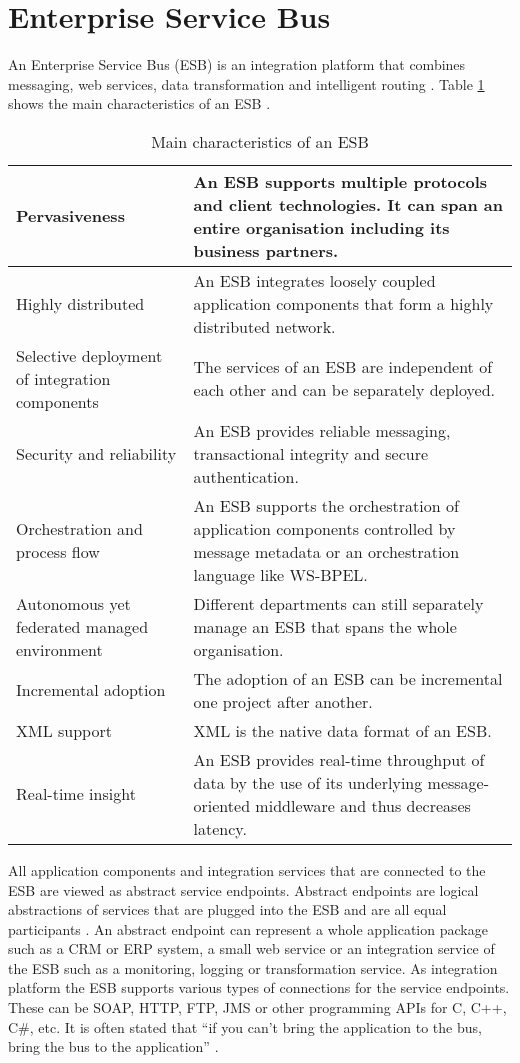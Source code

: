 \section{Enterprise Service Bus}
An Enterprise Service Bus (ESB) is an integration platform that combines messaging, web services, data transformation and intelligent routing \citep{Schulte:2002mz}.
Table \ref{tab:char_esb} shows the main characteristics of an ESB \citep{Chappell:2004jo}.
\begin{table}[htbp]
	\centering
	\begin{tabular}{|p{}|p{}|}
		\hline
		Pervasiveness & An ESB supports multiple protocols and client technologies. It can span an entire organisation including its business partners. \\ \hline
		Highly distributed & An ESB integrates loosely coupled application components that form a highly distributed network. \\ \hline
		Selective deployment of integration components & The services of an ESB are independent of each other and can be separately deployed. \\ \hline
		Security and reliability & An ESB provides reliable messaging, transactional integrity and secure authentication. \\ \hline
		Orchestration and process flow & An ESB supports the orchestration of application components controlled by message metadata or an orchestration language like WS-BPEL. \\ \hline
		Autonomous yet federated managed environment & Different departments can still separately manage an ESB that spans the whole organisation. \\ \hline
		Incremental adoption & The adoption of an ESB can be incremental one project after another. \\ \hline
		XML support & XML is the native data format of an ESB. \\ \hline
		Real-time insight & An ESB provides real-time throughput of data by the use of its underlying message-oriented middleware and thus decreases latency. \\
		\hline
	\end{tabular}
	\caption{Main characteristics of an ESB \citep{Chappell:2004jo}}
	\label{tab:char_esb}
\end{table}
All application components and integration services that are connected to the ESB are viewed as abstract service endpoints. Abstract endpoints are logical abstractions of services that are plugged into the ESB and are all equal participants \citep{Chappell:2004jo}. An abstract endpoint can represent a whole application package such as a CRM or ERP system, a small web service or an integration service of the ESB such as a monitoring, logging or transformation service. As integration platform the ESB supports various types of connections for the service endpoints. These can be SOAP, HTTP, FTP, JMS or other programming APIs for C, C++, C\#, etc. It is often stated that ``if you can't bring the application to the bus, bring the bus to the application'' \citep{Chappell:2004jo}.

